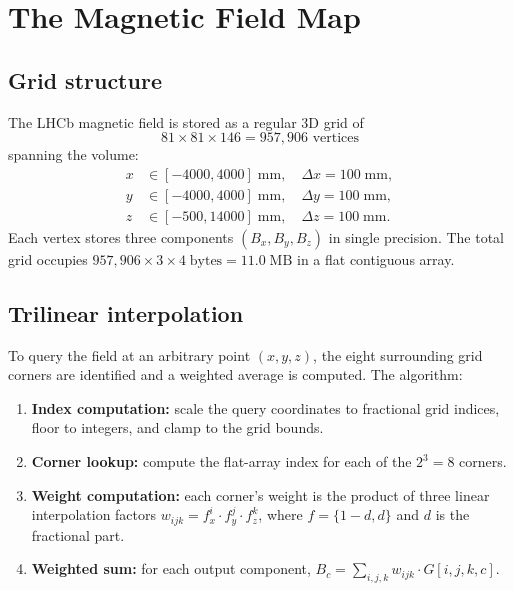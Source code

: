 \documentclass[11pt,a4paper]{article}
\begin{document}
\section{The Magnetic Field Map}
\label{sec:fieldmap}

\subsection{Grid structure}

The LHCb magnetic field is stored as a regular 3D grid of
\begin{equation}
    81 \times 81 \times 146 = 957{,}906 \text{ vertices}
\end{equation}
spanning the volume:
\begin{align}
    x &\in [-4000, 4000] \;\text{mm}, \quad \Delta x = 100\;\text{mm}, \nonumber \\
    y &\in [-4000, 4000] \;\text{mm}, \quad \Delta y = 100\;\text{mm}, \\
    z &\in [-500, 14000]  \;\text{mm}, \quad \Delta z = 100\;\text{mm}. \nonumber
\end{align}
Each vertex stores three components $(B_x, B_y, B_z)$ in single
precision.  The total grid occupies
$957{,}906 \times 3 \times 4\;\text{bytes} = 11.0\;\text{MB}$ in a
flat contiguous array.


\subsection{Trilinear interpolation}
\label{sec:trilinear}

To query the field at an arbitrary point $(x,y,z)$, the eight
surrounding grid corners are identified and a weighted average
is computed.  The algorithm:

\begin{enumerate}
    \item \textbf{Index computation:} scale the query coordinates to
          fractional grid indices, floor to integers, and clamp to the
          grid bounds.
    \item \textbf{Corner lookup:} compute the flat-array index for
          each of the $2^3 = 8$ corners.
    \item \textbf{Weight computation:} each corner's weight is the
          product of three linear interpolation factors
          $w_{ijk} = f_x^i \cdot f_y^j \cdot f_z^k$,
          where $f = \{1-d, d\}$ and $d$ is the fractional part.
    \item \textbf{Weighted sum:} for each output component,
          $B_c = \sum_{i,j,k} w_{ijk} \cdot G[i,j,k,c]$.
\end{enumerate}
\end{document}

